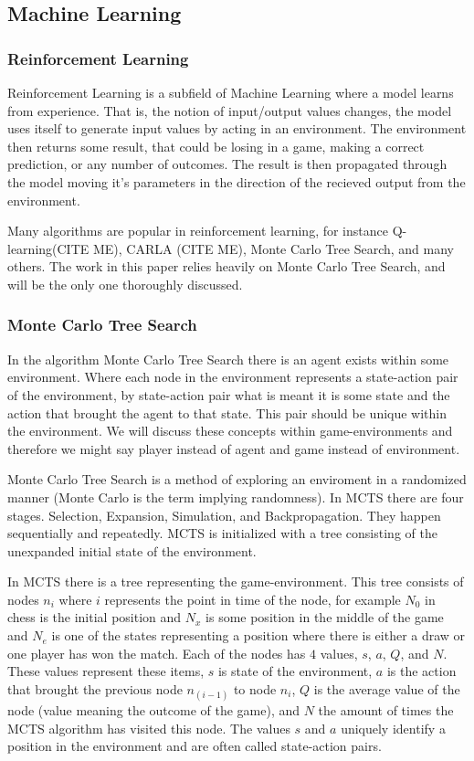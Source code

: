\subsection{Machine Learning}

\subsubsection{Reinforcement Learning}

Reinforcement Learning is a subfield of Machine Learning where a model learns from experience.
That is, the notion of input/output values changes, the model uses itself to generate input
values by acting in an environment. The environment then returns some result, that could be
losing in a game, making a correct prediction, or any number of outcomes. The result is then
propagated through the model moving it's parameters in the direction of the recieved output
from the environment.

Many algorithms are popular in reinforcement learning, for instance Q-learning(CITE ME), CARLA (CITE ME),
Monte Carlo Tree Search, and many others. The work in this paper relies heavily on Monte Carlo Tree Search,
and will be the only one thoroughly discussed.

\subsubsection{Monte Carlo Tree Search}

In the algorithm Monte Carlo Tree Search there is an agent exists
within some environment. Where each node in the environment represents a state-action pair of the environment, by
state-action pair what is meant it is some state and the action that brought the agent to
that state. This pair should be unique within the environment. We will discuss these concepts within game-environments
and therefore we might say player instead of agent and game instead of environment.

Monte Carlo Tree Search is a method of exploring an enviroment in a randomized manner (Monte Carlo is the term implying
randomness). In MCTS there are four stages. Selection, Expansion, Simulation, and Backpropagation. They happen sequentially
and repeatedly. MCTS is initialized with a tree consisting of the unexpanded initial state of the environment.

In MCTS there is a tree representing the game-environment. This tree consists of nodes $n_i$ where $i$ represents the point in time
of the node, for example $N_0$ in chess is the initial position and $N_x$ is some position in the middle of the game and $N_e$ is one of
the states representing a position where there is either a draw or one player has won the match. Each of the nodes has $4$ values,
$s$, $a$, $Q$, and $N$. These values represent these items, $s$ is state of the environment, $a$ is the action that brought
the previous node $n_(i-1)$ to node $n_i$, $Q$ is the average value of the node (value meaning the outcome of the game),
and $N$ the amount of times the MCTS algorithm has visited this node. The values $s$ and $a$ uniquely identify a position
in the environment and are often called state-action pairs.


